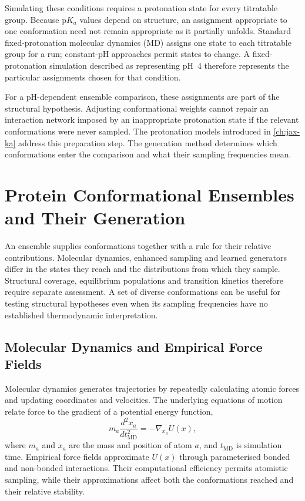 Simulating these conditions requires a protonation state for every titratable group. Because $\mathrm{p}K_a$ values depend on structure, an assignment appropriate to one conformation need not remain appropriate as it partially unfolds. Standard fixed-protonation molecular dynamics (MD) assigns one state to each titratable group for a run; constant-pH approaches permit states to change.\supercite{deoliveiraConstantPHMolecular2022} A fixed-protonation simulation described as representing pH~4 therefore represents the particular assignments chosen for that condition.

For a pH-dependent ensemble comparison, these assignments are part of the structural hypothesis. Adjusting conformational weights cannot repair an interaction network imposed by an inappropriate protonation state if the relevant conformations were never sampled. The protonation models introduced in \cref{ch:jax-ka} address this preparation step. The generation method determines which conformations enter the comparison and what their sampling frequencies mean.

\section{Protein Conformational Ensembles and Their Generation}
\label{sec:bg-ensemble-generation}

An ensemble supplies conformations together with a rule for their relative contributions. Molecular dynamics, enhanced sampling and learned generators differ in the states they reach and the distributions from which they sample. Structural coverage, equilibrium populations and transition kinetics therefore require separate assessment. A set of diverse conformations can be useful for testing structural hypotheses even when its sampling frequencies have no established thermodynamic interpretation.\supercite{heninEnhancedSamplingMethods2022,noeBoltzmannGeneratorsSampling2019}

\subsection{Molecular Dynamics and Empirical Force Fields}
\label{sec:bg-md}

Molecular dynamics generates trajectories by repeatedly calculating atomic forces and updating coordinates and velocities. The underlying equations of motion relate force to the gradient of a potential energy function,
\begin{equation}
    m_a\frac{d^2x_a}{dt_{\text{MD}}^2}=-\nabla_{x_a}U(x),
    \label{eq:bg-newton}
\end{equation}
where $m_a$ and $x_a$ are the mass and position of atom $a$, and $t_{\text{MD}}$ is simulation time. Empirical force fields approximate $U(x)$ through parameterised bonded and non-bonded interactions. Their computational efficiency permits atomistic sampling, while their approximations affect both the conformations reached and their relative stability.\supercite{hollingsworthMolecularDynamicsSimulation2018}

